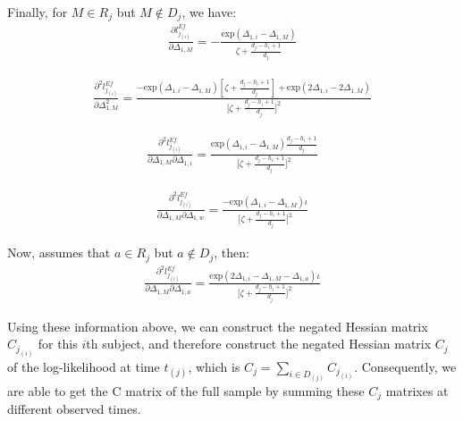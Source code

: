 \documentclass[]{article}
\begin{document}
Finally, for \(M \in R_j\) but \(M \notin D_j\), we have:
\begin{equation}\begin{aligned}\label{eqn:Efron11}
\frac{\partial l_{j_{(i)}}^{Ef}}{\partial \Delta_{1,M}} = -\frac{\text{exp}(\Delta_{1,i}-\Delta_{1,M})}{\zeta + \frac{d_j-h_i+1}{d_j}}
\end{aligned}\end{equation}

\begin{equation}\begin{aligned}\label{eqn:Efron12}
\frac{\partial^2 l_{j_{(i)}}^{Ef}}{\partial \Delta_{1,M}^2} = \frac{-\text{exp}(\Delta_{1,i}-\Delta_{1,M})[\zeta+\frac{d_j-h_i+1}{d_j}]+\text{exp}(2\Delta_{1,i}-2\Delta_{1,M})}{\bigg[\zeta + \frac{d_j-h_i+1}{d_j}\bigg]^2}
\end{aligned}\end{equation}

\begin{equation}\begin{aligned}\label{eqn:Efron13}
\frac{\partial^2 l_{j_{(i)}}^{Ef}}{\partial \Delta_{1,M}\partial \Delta_{1,i}} = \frac{\text{exp}(\Delta_{1,i}-\Delta_{1,M})\frac{d_j-h_i+1}{d_j}}{\bigg[\zeta + \frac{d_j-h_i+1}{d_j}\bigg]^2}
\end{aligned}\end{equation}

\begin{equation}\begin{aligned}\label{eqn:Efron14}
\frac{\partial^2 l_{j_{(i)}}^{Ef}}{\partial \Delta_{1,M}\partial \Delta_{1,w}} = \frac{-\text{exp}(\Delta_{1,i}-\Delta_{1,M})\iota}{\bigg[\zeta + \frac{d_j-h_i+1}{d_j}\bigg]^2}
\end{aligned}\end{equation}

Now, assumes that \(a\in R_j\) but \(a \notin D_j\), then:
\begin{equation}\begin{aligned}\label{eqn:Efron15}
\frac{\partial^2 l_{j_{(i)}}^{Ef}}{\partial \Delta_{1,M}\partial \Delta_{1,a}} = \frac{\text{exp}(2\Delta_{1,i}-\Delta_{1,M}-\Delta_{1,a})\iota}{\bigg[\zeta + \frac{d_j-h_i+1}{d_j}\bigg]^2}
\end{aligned}\end{equation}

Using these information above, we can construct the negated Hessian
matrix \(C_{j_{(i)}}\) for this \(i\)th subject, and therefore construct
the negated Hessian matrix \(C_j\) of the log-likelihood at time
\(t_{(j)}\), which is \(C_j = \sum_{i\in D_{(j)}}C_{j_{(i)}}\).
Consequently, we are able to get the C matrix of the full sample by
summing these \(C_j\) matrixes at different observed times.
\end{document}
